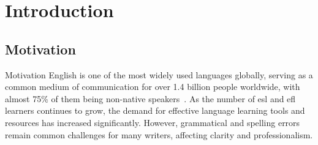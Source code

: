 \section{Introduction}

\subsection{Motivation}
\begin{frame}{Motivation}
  English is one of the most widely used languages globally, serving as a common medium of communication for over \alert{1.4 billion} people worldwide, with almost \alert{75\%} of them being non-native speakers~\citep{eberhard2015ethnologue}.
  As the number of esl and efl learners continues to grow, the demand for effective language learning tools and resources has increased significantly.
  However, grammatical and spelling errors remain common challenges for many writers, affecting clarity and professionalism.
\end{frame}
